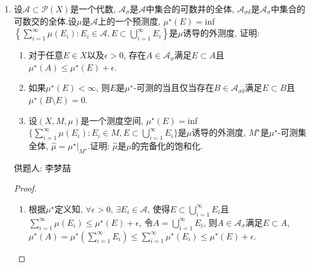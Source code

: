 \documentclass[lang=cn,12pt,a4paper]{elegantpaper.cls}
\begin{document}
\begin{enumerate}
	
		\item  设$\mathscr{A}\subset{\mathscr{P}}(X)$是一个代数, $\mathscr{A}_\sigma$是$\mathscr{A}$中集合的可数并的全体, 
	$\mathscr{A}_{\sigma\delta}$是$\mathscr{A}_\sigma$中集合的可数交的全体.设$\mu$是$\mathscr{A}$上的一个预测度, $\mu^{\star}(E)=$inf$\left\{\sum\limits_{i=1}^{\infty}\mu(E_i):E_i\in{\mathscr{A}},E\subset{\bigcup\limits_{i=1}^{\infty}E_i}\right\}$是$\mu$诱导的外测度, 证明:  \begin{enumerate}[(1)]
		\item 对于任意$E\in{X}$以及$\epsilon>0$, 存在$A\in{\mathscr{A}_{\sigma}}$满足$E\subset{A}$且$\mu^{\star}(A)\leq\mu^{\star}(E)+\epsilon$.
		\item 如果$\mu^{\star}(E)<\infty$, 则$E$是$\mu^{\star}$-可测的当且仅当存在$B\in{\mathscr{A_{\sigma\delta}}}$满足$E\subset{B}$且$\mu^{\star}(B\setminus{E})=0$.
		\item 设$(X,M,\mu)$是一个测度空间, $\mu^{\star}(E)=$inf$\{\sum\limits_{i=1}^{\infty}\mu(E_i):E_i\in{M},E\subset{\bigcup\limits_{i=1}^{\infty}E_i}\}$是$\mu$诱导的外测度, $M^{\star}$是$\mu^{\star}$-可测集全体, $\widehat{\mu}=\mu^{\star}|_{M^{\star}}$.证明: $\widehat{\mu}$是$\mu$的完备化的饱和化.
	\end{enumerate}
	\begin{flushright}
		\kaishu
		供题人: 李梦喆
	\end{flushright}
	 \begin{proof}
		\begin{enumerate}[(1)]
			\item 根据$\mu^{\star}$定义知, $\forall\epsilon>0$, $\exists E_i\in{\mathscr{A}}$, 使得$E\subset{\bigcup\limits_{i=1}^{\infty}E_i}$且$\sum\limits_{i=1}^{\infty}\mu(E_i)\leq\mu^{\star}(E)+\epsilon$, 令$A=\bigcup\limits_{i=1}^{\infty}E_i$, 则$A\in{\mathscr{A}_\sigma}$满足$E\subset{A}$, $\mu^{\star}(A)=\mu^{\star}(\sum\limits_{i=1}^{\infty }E_i)\leq\sum\limits_{i=1}^{\infty}\mu^{\star}(E_i)\leq\mu^{\star}(E)+\epsilon$.

\end{enumerate}
\end{proof}
\end{enumerate}
\end{document}

